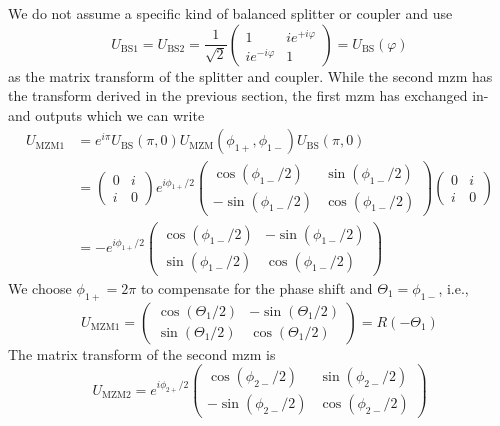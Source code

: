 We do not assume a specific kind of balanced splitter or coupler and use
\begin{equation}
	U_\text{BS1}
	=
	U_\text{BS2}
	=
	\frac{1}{\sqrt{2}}
	\begin{pmatrix}
		1 & ie^{+i\varphi} \\
		ie^{-i\varphi} & 1
	\end{pmatrix}
	=
	U_\text{BS}(\varphi)
\end{equation}
as the matrix transform of the splitter and coupler.
While the second \gls{mzm} has the transform derived in the previous section, the first \gls{mzm} has exchanged in- and outputs which we can write
\begin{equation}
	\begin{split}
		U_\text{MZM1}
		&=
		e^{i\pi}
		U_\text{BS}(\pi,0)
		U_\text{MZM}(\phi_{1+},\phi_{1-})
		U_\text{BS}(\pi,0)
		\\
		&=
		\begin{pmatrix}
			0 & i \\
			i & 0
		\end{pmatrix}
		e^{i\phi_{1+}/2}
		\begin{pmatrix}
			\cos(\phi_{1-}/2) & \sin(\phi_{1-}/2) \\
			-\sin(\phi_{1-}/2) & \cos(\phi_{1-}/2)
		\end{pmatrix}
		\begin{pmatrix}
			0 & i \\
			i & 0
		\end{pmatrix}
		\\
		&=
		-
		e^{i\phi_{1+}/2}
		\begin{pmatrix}
			\cos(\phi_{1-}/2) & -\sin(\phi_{1-}/2) \\
			\sin(\phi_{1-}/2) & \cos(\phi_{1-}/2)
		\end{pmatrix}
	\end{split}
\end{equation}
We choose $\phi_{1+}=2\pi$ to compensate for the phase shift and $\Theta_1=\phi_{1-}$, i.e.,
\begin{equation}
	U_\text{MZM1}
	=
	\begin{pmatrix}
		\cos(\Theta_1/2) & -\sin(\Theta_1/2) \\
		\sin(\Theta_1/2) & \cos(\Theta_1/2)
	\end{pmatrix}
	=
	R(-\Theta_1)
\end{equation}
The matrix transform of the second \gls{mzm} is
\begin{equation}
	U_\text{MZM2}
	=
	e^{i\phi_{2+}/2}
	\begin{pmatrix}
		\cos(\phi_{2-}/2) & \sin(\phi_{2-}/2) \\
		-\sin(\phi_{2-}/2) & \cos(\phi_{2-}/2)
	\end{pmatrix}
\end{equation}
